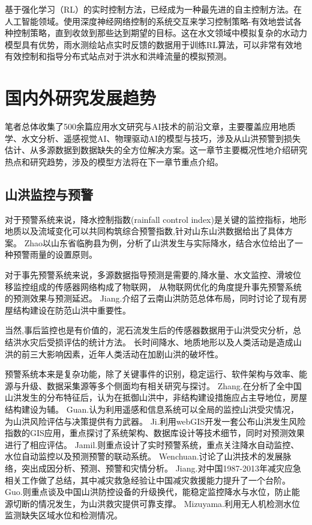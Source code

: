 \documentclass{ctexart}
\begin{document}
基于强化学习（RL）的实时控制方法，已经成为一种最先进的自主控制方法。在人工智能领域。使用深度神经网络控制的系统交互来学习控制策略-有效地尝试各种控制策略，直到收敛到那些达到期望的目标。这在水文领域中模拟复杂的水动力模型具有优势，雨水测绘站点实时反馈的数据用于训练RL算法，可以非常有效地有效控制和指导分布式站点对于洪水和洪峰流量的模拟预测。



\section{国内外研究发展趋势}

笔者总体收集了500余篇应用水文研究与AI技术的前沿文章，主要覆盖应用地质学、水文分析、遥感视觉AI、物理驱动AI的模型与技巧，涉及从山洪预警到损失估计、从多源数据到数据缺失的全方位解决方案。这一章节主要概况性地介绍研究热点和研究趋势，涉及的模型方法将在下一章节重点介绍。


\subsection{山洪监控与预警}



对于预警系统来说，降水控制指数(rainfall control index)是关键的监控指标，地形地质以及流域变化可以共同构筑综合预警指数,\cite{zhao2011research}针对山东山洪数据给出了具体方案。
Zhao\cite{zhao2011research}以山东省临朐县为例，分析了山洪发生与实际降水，结合水位给出了一种预警雨量的设置原则。

对于事先预警系统来说，多源数据指导预测是需要的,降水量、水文监控、滑坡位移监控组成的传感器网络构成了物联网\cite{zeng2014mountain}，
从物联网优化的角度提升事先预警系统的预测效果与预测延迟\cite{zhang2013mountain}。
Jiang.\cite{jiang2017current}介绍了云南山洪防范总体布局，同时讨论了现有房屋结构建设在防范山洪中重要性。

当然,事后监控也是有价值的，泥石流发生后的传感器数据用于山洪受灾分析，总结洪水灾后受损评估的统计方法\cite{shen2015progress}。
长时间降水、地质地形以及人类活动是造成山洪的前三大影响因素，近年人类活动在加剧山洪的破坏性\cite{hongyu2007elementary}。

预警系统本来是复杂功能，除了关键事件的识别，稳定运行、软件架构与效率、能源与升级、数据采集源等多个侧面均有相关研究与探讨。
Zhang.\cite{zhang2007zone}在分析了全中国山洪发生的分布特征后，认为在抵御山洪中，非结构建设措施应占主导地位，房屋结构建设为辅。
Guan.\cite{guan2007research}认为利用遥感和信息系统可以全局的监控山洪受灾情况，为山洪风险评估与决策提供有力武器。
Ji.\cite{jiqiu2010design}利用webGIS开发一套公布山洪发生风险指数的GIS应用，重点探讨了系统架构、数据库设计等技术细节，同时对预测效果进行了相应评估。
Jamil.\cite{jamil2013applied}则重点设计了实时预警系统，重点关注降水自动监控、水位自动监控以及预测预警的联动系统。
Wenchuan.\cite{wenchuan2011review}讨论了山洪技术的发展脉络，突出成因分析、预测、预警和灾情分析。
Jiang.\cite{jiang2013implementation}对中国1987-2013年减灾应急相关工作做了总结，其中减灾救急经验让中国减灾救援能力提升了一个台阶。
Guo.\cite{guo2018comprehensive}则重点谈及中国山洪防控设备的升级换代，能稳定监控降水与水位，防止能源切断的情况发生，为山洪救灾提供可靠支撑。
Mizuyama.\cite{mizuyama2011sediment}利用无人机检测水位监测缺失区域水位和检测情况。
\end{document}
